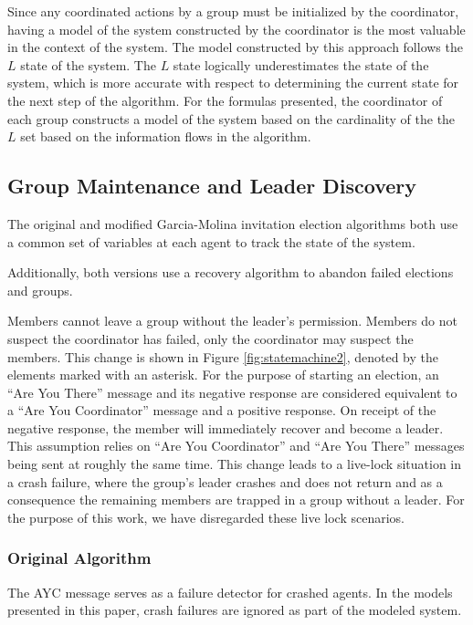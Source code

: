 Since any coordinated actions by a group must be initialized by the coordinator, having a model of the system constructed by the coordinator is the most valuable in the context of the system. The model constructed by this approach follows the $L$ state of the system. The $L$ state logically underestimates the state of the system, which is more accurate with respect to determining the current state for the next step of the algorithm. For the formulas presented, the coordinator of each group constructs a model of the system based on the cardinality of the the $L$ set based on the information flows in the algorithm.

\subsection{Group Maintenance and Leader Discovery}

The original and modified Garcia-Molina invitation election algorithms both use a common set of variables at each agent to track the state of the system.

Additionally, both versions use a recovery algorithm to abandon failed elections and groups.

Members cannot leave a group without the leader's permission.
Members do not suspect the coordinator has failed, only the coordinator may suspect the members.
This change is shown in Figure \ref{fig:statemachine2}, denoted by the elements marked with an asterisk.
For the purpose of starting an election, an ``Are You There'' message and its negative response are considered equivalent to a ``Are You Coordinator'' message and a positive response.
On receipt of the negative response, the member will immediately recover and become a leader.
This assumption relies on ``Are You Coordinator'' and ``Are You There'' messages being sent at roughly the same time.
This change leads to a live-lock situation in a crash failure, where the group's leader crashes and does not return and as a consequence the remaining members are trapped in a group without a leader.
For the purpose of this work, we have disregarded these live lock scenarios.

\subsubsection{Original Algorithm}

The \ac{AYC} message serves as a failure detector for crashed agents. In the models presented in this paper, crash failures are ignored as part of the modeled system.

